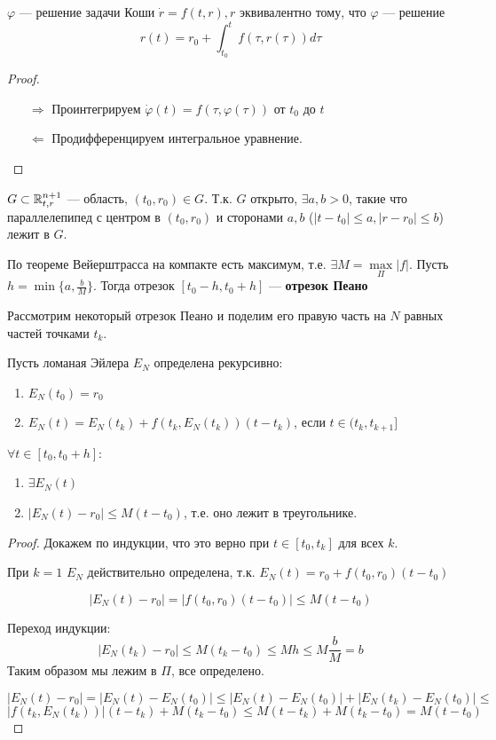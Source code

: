 \begin{lemma}
    \(\varphi\) --- решение задачи Коши \(\dot r = f(t, r), r\) эквивалентно тому, что \(\varphi\) --- решение
    \[r(t) = r_0 + \int_{t_0}^t f(\tau, r(\tau)) d\tau\]
\end{lemma}
\begin{proof}\itemfix
    \begin{itemize}
        \item [\( \Rightarrow \)] Проинтегрируем \(\dot \varphi(t) = f(\tau, \varphi(\tau))\) от \(t_0\) до \(t\)
        \item [\( \Leftarrow \)] Продифференцируем интегральное уравнение.
    \end{itemize}
\end{proof}

\begin{definition}
    \(G\subset \mathbb{R}^{n + 1}_{t, r}\) --- область, \((t_0, r_0)\in G\). Т.к. \(G\) открыто, \(\exists a, b > 0\), такие что параллелепипед с центром в \((t_0, r_0)\) и сторонами \(a, b\) (\(|t - t_0| \leq a, |r - r_0| \leq b\)) лежит в \(G\).

    По теореме Вейерштрасса на компакте есть максимум, т.е. \(\exists M = \max\limits_{\Pi} |f|\). Пусть \(h = \min \{a, \frac{b}{M}\} \). Тогда отрезок \([t_0 - h, t_0 + h]\) --- \textbf{отрезок Пеано}
\end{definition}

Рассмотрим некоторый отрезок Пеано и поделим его правую часть на \(N\) равных частей точками \(t_k\).

Пусть ломаная Эйлера \(E_N\) определена рекурсивно:
\begin{enumerate}
    \item \(E_N(t_0) = r_0\)
    \item \(E_N(t) = E_N(t_k) + f(t_k, E_N(t_k))(t - t_k)\), если \(t\in(t_k, t_{k+1}]\)
\end{enumerate}

\begin{lemma}
    \(\forall t\in[t_0, t_0 + h]\):
    \begin{enumerate}
        \item \(\exists E_N(t)\)
        \item \(|E_N(t) - r_0| \leq M(t - t_0)\), т.е. оно лежит в треугольнике.
    \end{enumerate}
\end{lemma}
\begin{proof}
    Докажем по индукции, что это верно при \(t\in[t_0, t_k]\) для всех \(k\).

    При \(k = 1\) \(E_N\) действительно определена, т.к. \(E_N(t) = r_0 + f(t_0, r_0)(t - t_0)\)

    \[|E_N(t) - r_0| = |f(t_0, r_0)(t - t_0)| \leq M(t - t_0)\]

    Переход индукции:
    \[|E_N(t_k) - r_0| \leq M(t_k - t_0) \leq Mh \leq M \frac{b}{M} = b\]
    Таким образом мы лежим в \(\Pi\), все определено.

    \[|E_N(t) - r_0| = |E_N(t) - E_N(t_0)| \leq |E_N(t) - E_N(t_0)| + |E_N(t_k) - E_N(t_0)| \leq\]
    \[|f(t_k, E_N(t_k))|(t - t_k) + M(t_k - t_0) \leq M(t - t_k) + M(t_k - t_0) = M(t - t_0)\]
\end{proof}

